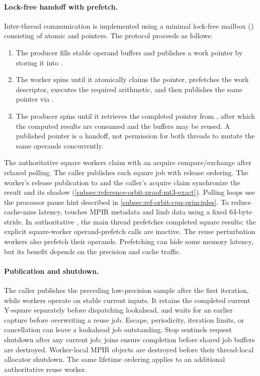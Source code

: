 \paragraph{Lock-free handoff with prefetch.}
Inter-thread communication is implemented using a minimal lock-free mailbox
() consisting of atomic  and 
pointers.  The protocol proceeds as follows:
\begin{enumerate}
  \item The producer fills stable operand buffers and publishes a work pointer
        by storing it into .
  \item The worker spins until it atomically claims the pointer, prefetches the
        work descriptor, executes the required arithmetic, and then
        publishes the same pointer via .
  \item The producer spins until it retrieves the completed pointer from
        , after which the computed results are consumed and the
        buffers may be reused.  A published pointer is a handoff, not permission
        for both threads to mutate the same operands concurrently.
\end{enumerate}
The authoritative square workers claim  with an acquire
compare/exchange after relaxed polling. The caller publishes each square job
with release ordering. The worker's release publication to  and
the caller's acquire claim synchronize the result and its shadow
(\cref{subsec:reference-orbit-proof-mt3-exact}). Polling loops use the
processor pause hint described in \cref{subsec:ref-orbit-cpu-principles}.
To reduce cache-miss latency,  touches MPIR metadata
and limb data using a fixed 64-byte stride.  In authoritative ,
the main thread prefetches completed square results; the explicit square-worker
operand-prefetch calls are inactive.  The reuse perturbation workers also
prefetch their operands.  Prefetching can hide some memory latency, but its
benefit depends on the precision and cache traffic.

\paragraph{Publication and shutdown.}
The caller publishes the preceding low-precision sample after the first
iteration, while workers operate on stable current inputs. It retains the
completed current Y-square separately before dispatching lookahead, and waits
for an earlier capture before overwriting a reuse job. Escape, periodicity,
iteration limits, or cancellation can leave a lookahead job outstanding.
Stop sentinels request shutdown after any current job; joins ensure completion
before shared job buffers are destroyed. Worker-local MPIR objects are
destroyed before their thread-local allocator shutdown. The same lifetime
ordering applies to an additional authoritative reuse worker.

